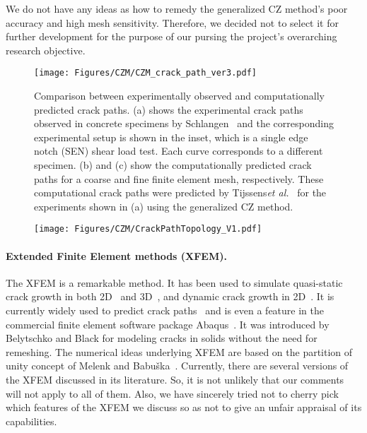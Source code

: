 \documentclass[10pt,letterpaper]{article}
\begin{document}
    We do not have any ideas as how to remedy the generalized CZ method's poor accuracy and high mesh sensitivity. Therefore, we decided not to select it for further development for the purpose of our pursing the project's overarching research objective.

    \begin{figure}
          \centering
          \texttt{[image: Figures/CZM/CZM\_crack\_path\_ver3.pdf]}
          \caption{\footnotesize Comparison between experimentally observed and computationally predicted crack paths. (a) shows the experimental crack paths observed in concrete specimens by Schlangen~\cite{schlangen1993experimental} and the corresponding experimental setup is shown in the inset, which is a single edge notch (SEN) shear load test. Each curve corresponds to a different specimen. (b) and (c) show the computationally predicted crack paths for a coarse and fine finite  element mesh, respectively. These computational crack paths  were predicted by Tijssens\textit{et al.}~\cite{tijssens2000numerical} for the experiments shown in (a) using the generalized CZ method.}
          \label{f:czm}
    \end{figure}

    \begin{figure}
          \centering
          \texttt{[image: Figures/CZM/CrackPathTopology\_V1.pdf]}
          \caption{\footnotesize}
          \label{f:topchanges}
    \end{figure}

    \paragraph{Extended Finite Element methods (XFEM).} The XFEM is a remarkable method. It has been used to  simulate quasi-static crack growth in both 2D~\cite{belytschko1999elastic,bordas2007extended,dolbow1999finite} and 3D~\cite{sukumar2000extended,moes2002non,gravouil2002non}, and dynamic crack growth in 2D~\cite{belytschko2003dynamic,song2006method}. It is currently widely used to predict crack paths~\cite{golewski2012numerical,barkai2012crack,peng2017extended} and is even a feature in the commercial finite element software package Abaqus~\cite{abaqus2014}. It was introduced by Belytschko and Black \cite{belytschko1999elastic} for modeling cracks in solids without the need for remeshing. The numerical ideas underlying XFEM  are based on the partition of unity concept of Melenk and Babu\v ska~\cite{melenk1996partition}.  Currently, there are several versions of the XFEM  discussed in its literature. So, it is not unlikely that our comments will not apply to all of them. Also, we have sincerely tried not to cherry pick which features of the XFEM we discuss so as not to give an unfair appraisal of its capabilities.
\end{document}
